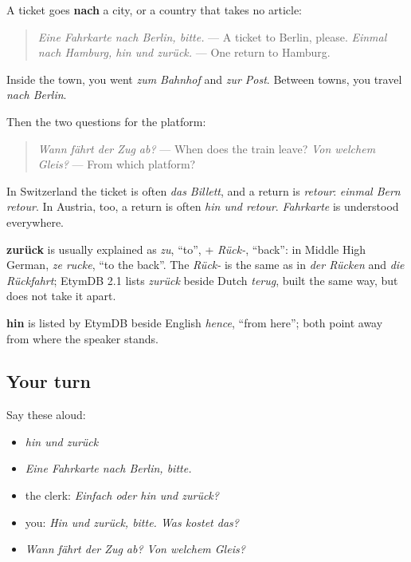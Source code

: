 \begin{grammarlens}[title={Grammar Lens: nach for a city, zum for a place in town}]
A ticket goes \textbf{nach} a city, or a country that takes no article:

\begin{quote}
\emph{Eine Fahrkarte nach Berlin, bitte.} — A ticket to Berlin, please. \emph{Einmal nach Hamburg, hin und zurück.} — One return to Hamburg.
\end{quote}

Inside the town, you went \emph{zum Bahnhof} and \emph{zur Post}. Between towns, you travel \emph{nach Berlin}.

Then the two questions for the platform:

\begin{quote}
\emph{Wann fährt der Zug ab?} — When does the train leave? \emph{Von welchem Gleis?} — From which platform?
\end{quote}

In Switzerland the ticket is often \emph{das Billett}, and a return is \emph{retour}: \emph{einmal Bern retour}. In Austria, too, a return is often \emph{hin und retour}. \emph{Fahrkarte} is understood everywhere.
\end{grammarlens}

\begin{cousinweb}
\textbf{zurück} is usually explained as \emph{zu}, \textquotedblleft{}to\textquotedblright{}, + \emph{Rück-}, \textquotedblleft{}back\textquotedblright{}: in Middle High German, \emph{ze rucke}, \textquotedblleft{}to the back\textquotedblright{}. The \emph{Rück-} is the same as in \emph{der Rücken} and \emph{die Rückfahrt}; EtymDB 2.1 lists \emph{zurück} beside Dutch \emph{terug}, built the same way, but does not take it apart.

\textbf{hin} is listed by EtymDB beside English \emph{hence}, \textquotedblleft{}from here\textquotedblright{}; both point away from where the speaker stands.
\end{cousinweb}

\subsection*{Your turn}
Say these aloud:

\begin{itemize}
\raggedright
  \item \emph{hin und zurück}
  \item \emph{Eine Fahrkarte nach Berlin, bitte.}
  \item the clerk: \emph{Einfach oder hin und zurück?}
  \item you: \emph{Hin und zurück, bitte. Was kostet das?}
  \item \emph{Wann fährt der Zug ab? Von welchem Gleis?}
\end{itemize}

